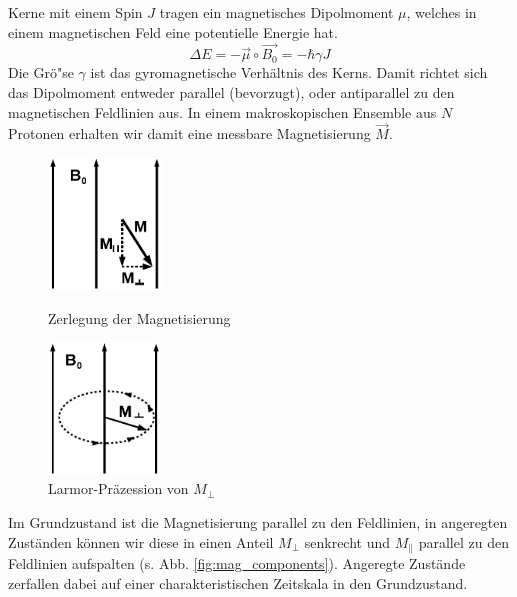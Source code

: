 \documentclass[a4paper]{scrartcl} %
\begin{document}
Kerne mit einem Spin $J$ tragen ein magnetisches Dipolmoment $\mu$, welches in einem magnetischen Feld eine potentielle Energie hat.
\begin{equation}
	\Delta E = - \vec{\mu} \circ \vec{B_0} = - \hbar \gamma J
\end{equation}
Die Grö"se $\gamma$ ist das gyromagnetische Verhältnis des Kerns. Damit richtet sich das Dipolmoment entweder parallel (bevorzugt), oder antiparallel zu den magnetischen Feldlinien aus. In einem makroskopischen Ensemble aus $N$ Protonen erhalten wir damit eine messbare Magnetisierung $\vec{M}$.
\begin{figure}[H]
	\centering
	\parbox{70mm}{
		\centering
		\includegraphics[height=35mm]{./Resources/magnetization_components.png}
		\caption{Zerlegung der Magnetisierung}
		\label{fig:mag_components}
	}
	\hspace*{\fill}
	\parbox{70mm}{
		\centering
		\includegraphics[height=35mm]{./Resources/larmor_precession.png}
		\caption{Larmor-Präzession von $M_{\perp}$}
		\label{fig:larmor}
	}
\end{figure}

Im Grundzustand ist die Magnetisierung parallel zu den Feldlinien, in angeregten Zuständen können wir diese in einen Anteil $M_{\perp}$ senkrecht und $M_{\parallel}$ parallel zu den Feldlinien aufspalten (s. Abb. \ref{fig:mag_components}). Angeregte Zustände zerfallen dabei auf einer charakteristischen Zeitskala in den Grundzustand.
\end{document}

